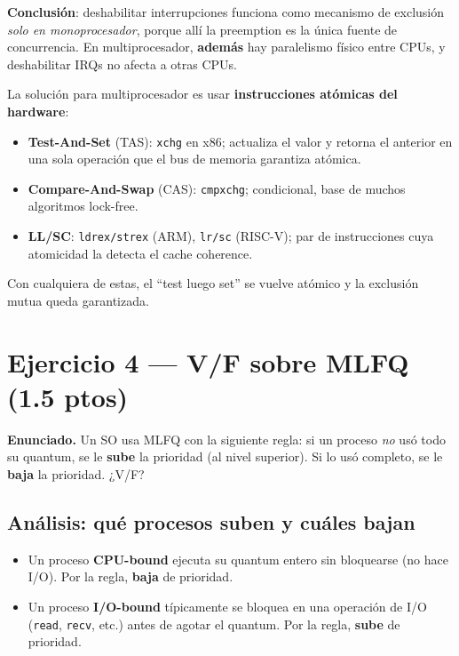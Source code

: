 \documentclass[11pt,a4paper]{article}
\begin{document}
\begin{importante}
\textbf{Conclusión}: deshabilitar interrupciones funciona como
mecanismo de exclusión \emph{solo en monoprocesador}, porque allí la
preemption es la única fuente de concurrencia. En multiprocesador,
\textbf{además} hay paralelismo físico entre CPUs, y deshabilitar
IRQs no afecta a otras CPUs.

La solución para multiprocesador es usar \textbf{instrucciones
atómicas del hardware}:

\begin{itemize}[leftmargin=*,nosep]
    \item \textbf{Test-And-Set} (TAS): \texttt{xchg} en x86;
        actualiza el valor y retorna el anterior en una sola
        operación que el bus de memoria garantiza atómica.
    \item \textbf{Compare-And-Swap} (CAS): \texttt{cmpxchg};
        condicional, base de muchos algoritmos lock-free.
    \item \textbf{LL/SC}: \texttt{ldrex/strex} (ARM),
        \texttt{lr/sc} (RISC-V); par de instrucciones cuya
        atomicidad la detecta el cache coherence.
\end{itemize}

Con cualquiera de estas, el ``test luego set'' se vuelve atómico y
la exclusión mutua queda garantizada.
\end{importante}

\section{Ejercicio 4 --- V/F sobre MLFQ (1.5 ptos)}

\textbf{Enunciado.} Un SO usa MLFQ con la siguiente regla: si un
proceso \emph{no} usó todo su quantum, se le \textbf{sube} la
prioridad (al nivel superior). Si lo usó completo, se le \textbf{baja}
la prioridad. ¿V/F?

\subsection*{Análisis: qué procesos suben y cuáles bajan}

\begin{itemize}[leftmargin=*,nosep]
    \item Un proceso \textbf{CPU-bound} ejecuta su quantum entero
        sin bloquearse (no hace I/O). Por la regla, \textbf{baja} de
        prioridad.
    \item Un proceso \textbf{I/O-bound} típicamente se bloquea en una
        operación de I/O (\texttt{read}, \texttt{recv}, etc.) antes
        de agotar el quantum. Por la regla, \textbf{sube} de prioridad.
\end{itemize}
\end{document}
